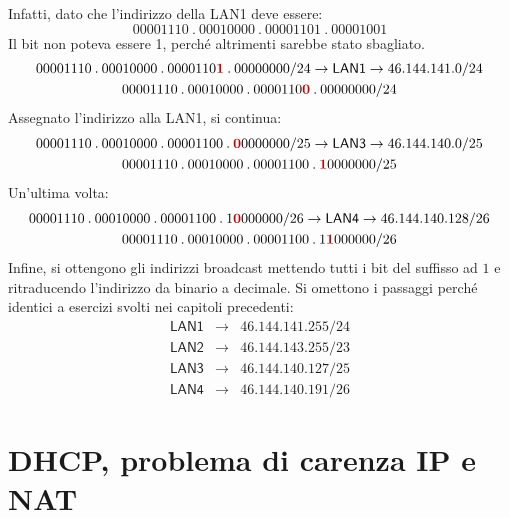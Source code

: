 \documentclass[a4paper]{article}
\newcommand{\binaryaddresspointed}[4]{#1\:.\:#2\:.\:#3\:.\:#4}
\begin{document}
	Infatti, dato che l'indirizzo della \textsf{LAN1} deve essere:
	\begin{equation*}
		\binaryaddresspointed{00001110}{00010000}{00001101}{00001001}
	\end{equation*}
	Il bit non poteva essere 1, perché altrimenti sarebbe stato sbagliato.
	\begin{gather*}
		\binaryaddresspointed{00001110}{00010000}{0000110\textcolor{Red3}{\boldsymbol{1}}}{00000000}/24 \rightarrow \textsf{LAN1} \rightarrow 46.144.141.0/24 \\
		\binaryaddresspointed{00001110}{00010000}{0000110\textcolor{Red3}{\boldsymbol{0}}}{00000000}/24
	\end{gather*}
	Assegnato l'indirizzo alla \textsf{LAN1}, si continua:
	\begin{gather*}
		\binaryaddresspointed{00001110}{00010000}{00001100}{\textcolor{Red3}{\boldsymbol{0}}0000000}/25 \rightarrow \textsf{LAN3} \rightarrow 46.144.140.0/25 \\
		\binaryaddresspointed{00001110}{00010000}{00001100}{\textcolor{Red3}{\boldsymbol{1}}0000000}/25
	\end{gather*}
	Un'ultima volta:
	\begin{gather*}
		\binaryaddresspointed{00001110}{00010000}{00001100}{1\textcolor{Red3}{\boldsymbol{0}}000000}/26 \rightarrow \textsf{LAN4} \rightarrow 46.144.140.128/26 \\
		\binaryaddresspointed{00001110}{00010000}{00001100}{1\textcolor{Red3}{\boldsymbol{1}}000000}/26
	\end{gather*}
	Infine, si ottengono gli indirizzi broadcast mettendo tutti i bit del suffisso ad $1$ e ritraducendo l'indirizzo da binario a decimale. Si omettono i passaggi perché identici a esercizi svolti nei capitoli precedenti:
	\begin{equation*}
		\begin{array}{lll}
			\textsf{LAN1} & \longrightarrow & 46.144.141.255/24 \\
			\textsf{LAN2} & \longrightarrow & 46.144.143.255/23 \\
			\textsf{LAN3} & \longrightarrow & 46.144.140.127/25 \\
			\textsf{LAN4} & \longrightarrow & 46.144.140.191/26
		\end{array}
	\end{equation*}\newpage
	
	\section{DHCP, problema di carenza IP e NAT}
	
\end{document}
